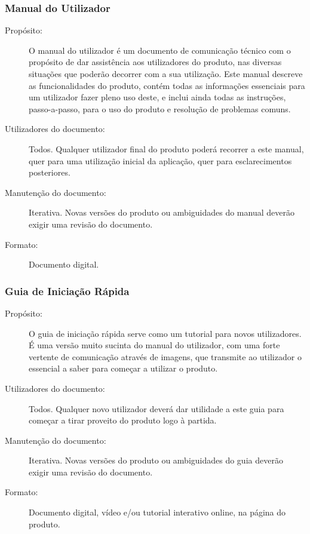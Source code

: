 \documentclass{article}
\begin{document}
    \subsubsection{Manual do Utilizador}
      \begin{description}
        \item[Propósito:]O manual do utilizador é um documento de comunicação técnico com o propósito de dar assistência aos utilizadores do produto, nas diversas situações que poderão decorrer com a sua utilização. Este manual descreve as funcionalidades do produto, contém todas as informações essenciais para um utilizador fazer pleno uso deste, e inclui ainda todas as instruções, passo-a-passo, para o uso do produto e resolução de problemas comuns.
        \item[Utilizadores do documento:]Todos. Qualquer utilizador final do produto poderá recorrer a este manual, quer para uma utilização inicial da aplicação, quer para esclarecimentos posteriores.

        \item[Manutenção do documento:]Iterativa. Novas versões do produto ou ambiguidades do manual deverão exigir uma revisão do documento.

        \item[Formato:]Documento digital.
      \end{description}

    \subsubsection{Guia de Iniciação Rápida}
      \begin{description}
        \item[Propósito:]O guia de iniciação rápida serve como um tutorial para novos utilizadores. É uma versão muito sucinta do manual do utilizador, com uma forte vertente de comunicação através de imagens, que transmite ao utilizador o essencial a saber para começar a utilizar o produto.

        \item[Utilizadores do documento:]Todos. Qualquer novo utilizador deverá dar utilidade a este guia para começar a tirar proveito do produto logo à partida.

        \item[Manutenção do documento:]Iterativa. Novas versões do produto ou ambiguidades do guia deverão exigir uma revisão do documento.
        \item[Formato:]Documento digital, vídeo e/ou tutorial interativo online, na página do produto.
      \end{description}
\end{document}
